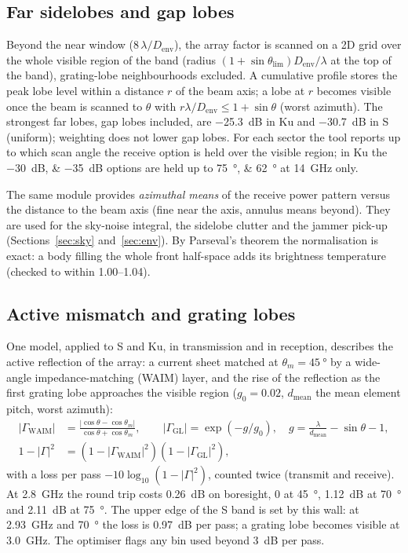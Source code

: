 \documentclass[11pt,a4paper]{article}
\newcommand{\Denv}{D_{\mathrm{env}}}
\begin{document}
\subsection{Far sidelobes and gap lobes}
Beyond the near window ($8\,\lambda/\Denv$), the array factor is scanned on a 2D grid over the whole visible region of
the band (radius $(1+\sin\theta_{\lim})\Denv/\lambda$ at the top of the band), grating-lobe neighbourhoods excluded.
A cumulative profile stores the peak lobe level within a distance $r$ of the beam axis; a lobe at $r$ becomes visible
once the beam is scanned to $\theta$ with $r\lambda/\Denv \le 1+\sin\theta$ (worst azimuth). The strongest far lobes,
gap lobes included, are \SI{-25.3}{dB} in Ku and \SI{-30.7}{dB} in S (uniform); weighting does not lower gap lobes.
For each sector the tool reports up to which scan angle the receive option is held over the visible region; in Ku the
\SIlist{-30;-35}{dB} options are held up to \SIlist{75;62}{\degree} at \SI{14}{GHz} only.

The same module provides \emph{azimuthal means} of the receive power pattern versus the distance to the beam axis
(fine near the axis, annulus means beyond). They are used for the sky-noise integral, the sidelobe clutter and the
jammer pick-up (Sections~\ref{sec:sky} and~\ref{sec:env}). By Parseval's theorem the normalisation is exact: a body
filling the whole front half-space adds its brightness temperature (checked to within 1.00--1.04).

\subsection{Active mismatch and grating lobes}\label{sec:mismatch}
One model, applied to S and Ku, in transmission and in reception, describes the active reflection of the array: a
current sheet matched at $\theta_m = \SI{45}{\degree}$ by a wide-angle impedance-matching (WAIM) layer, and the rise
of the reflection as the first grating lobe approaches the visible region ($g_0 = 0.02$, $d_{\mathrm{mean}}$ the mean
element pitch, worst azimuth):
\begin{align*}
  |\Gamma_{\mathrm{WAIM}}| &= \frac{|\cos\theta - \cos\theta_m|}{\cos\theta + \cos\theta_m},\qquad
  |\Gamma_{\mathrm{GL}}| = \exp(-g/g_0),\quad g = \frac{\lambda}{d_{\mathrm{mean}}} - \sin\theta - 1,\\
  1 - |\Gamma|^2 &= (1 - |\Gamma_{\mathrm{WAIM}}|^2)(1 - |\Gamma_{\mathrm{GL}}|^2),
\end{align*}
with a loss per pass $-10\log_{10}(1-|\Gamma|^2)$, counted twice (transmit and receive). At \SI{2.8}{GHz} the round
trip costs \SI{0.26}{dB} on boresight, 0 at \SI{45}{\degree}, \SI{1.12}{dB} at \SI{70}{\degree} and \SI{2.11}{dB} at
\SI{75}{\degree}. The upper edge of the S band is set by this wall: at \SI{2.93}{GHz} and \SI{70}{\degree} the loss is
\SI{0.97}{dB} per pass; a grating lobe becomes visible at \SI{3.0}{GHz}. The optimiser flags any bin used beyond
\SI{3}{dB} per pass.
\end{document}
